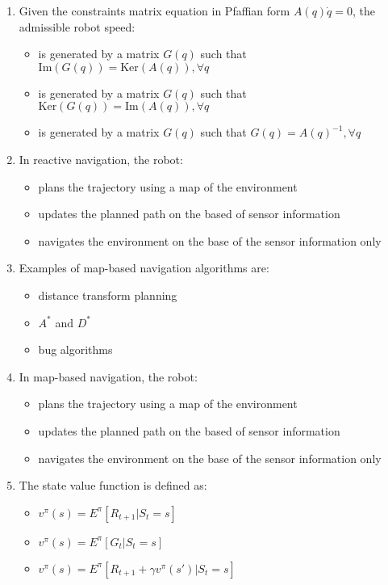 \documentclass[openany]{book}
\theoremstyle{definition}
\theoremstyle{remark}
\begin{document}
\begin{enumerate}
    \item Given the constraints matrix equation in Pfaffian form $A(q)\dot{q} = 0$, the admissible robot speed:
    \begin{itemize}
        \item[\checkmark] is generated by a matrix $G(q)$ such that $\text{Im}(G(q)) = \text{Ker}(A(q)), \forall q$
        \item[] is generated by a matrix $G(q)$ such that $\text{Ker}(G(q)) = \text{Im}(A(q)), \forall q$
        \item[] is generated by a matrix $G(q)$ such that $G(q) = A(q)^{-1}, \forall q$
    \end{itemize}

    \item In reactive navigation, the robot:
    \begin{itemize}
        \item[] plans the trajectory using a map of the environment
        \item[] updates the planned path on the based of sensor information
        \item[\checkmark] navigates the environment on the base of the sensor information only
    \end{itemize}

    \item Examples of map-based navigation algorithms are:
    \begin{itemize}
        \item[\checkmark] distance transform planning
        \item[\checkmark] $A^*$ and $D^*$
        \item[] bug algorithms
    \end{itemize}

    \item In map-based navigation, the robot:
    \begin{itemize}
        \item[\checkmark] plans the trajectory using a map of the environment
        \item[] updates the planned path on the based of sensor information
        \item[] navigates the environment on the base of the sensor information only
    \end{itemize}

    \item The state value function is defined as:
    \begin{itemize}
        \item[] $v^\pi(s) = E^\pi[R_{t+1}|S_t = s]$
        \item[\checkmark] $v^\pi(s) = E^\pi[G_t|S_t = s]$
        \item[] $v^\pi(s) = E^\pi[R_{t+1} + \gamma v^\pi(s')|S_t = s]$
    \end{itemize}


\end{enumerate}
\end{document}
